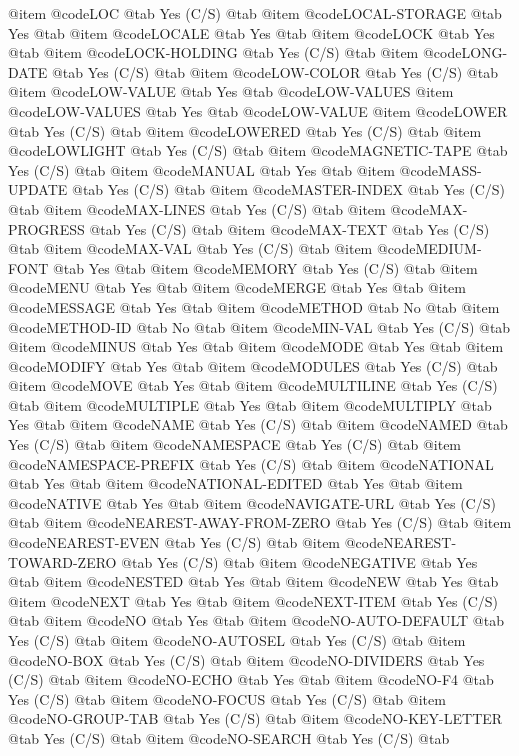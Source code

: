 @item @code{LOC} @tab Yes	(C/S) @tab 
@item @code{LOCAL-STORAGE} @tab Yes @tab 
@item @code{LOCALE} @tab Yes @tab 
@item @code{LOCK} @tab Yes @tab 
@item @code{LOCK-HOLDING} @tab Yes	(C/S) @tab 
@item @code{LONG-DATE} @tab Yes	(C/S) @tab 
@item @code{LOW-COLOR} @tab Yes	(C/S) @tab 
@item @code{LOW-VALUE} @tab Yes @tab @code{LOW-VALUES}
@item @code{LOW-VALUES} @tab Yes @tab @code{LOW-VALUE}
@item @code{LOWER} @tab Yes	(C/S) @tab 
@item @code{LOWERED} @tab Yes	(C/S) @tab 
@item @code{LOWLIGHT} @tab Yes	(C/S) @tab 
@item @code{MAGNETIC-TAPE} @tab Yes	(C/S) @tab 
@item @code{MANUAL} @tab Yes @tab 
@item @code{MASS-UPDATE} @tab Yes	(C/S) @tab 
@item @code{MASTER-INDEX} @tab Yes	(C/S) @tab 
@item @code{MAX-LINES} @tab Yes	(C/S) @tab 
@item @code{MAX-PROGRESS} @tab Yes	(C/S) @tab 
@item @code{MAX-TEXT} @tab Yes	(C/S) @tab 
@item @code{MAX-VAL} @tab Yes	(C/S) @tab 
@item @code{MEDIUM-FONT} @tab Yes @tab 
@item @code{MEMORY} @tab Yes	(C/S) @tab 
@item @code{MENU} @tab Yes @tab 
@item @code{MERGE} @tab Yes @tab 
@item @code{MESSAGE} @tab Yes @tab 
@item @code{METHOD} @tab No @tab 
@item @code{METHOD-ID} @tab No @tab 
@item @code{MIN-VAL} @tab Yes	(C/S) @tab 
@item @code{MINUS} @tab Yes @tab 
@item @code{MODE} @tab Yes @tab 
@item @code{MODIFY} @tab Yes @tab 
@item @code{MODULES} @tab Yes	(C/S) @tab 
@item @code{MOVE} @tab Yes @tab 
@item @code{MULTILINE} @tab Yes	(C/S) @tab 
@item @code{MULTIPLE} @tab Yes @tab 
@item @code{MULTIPLY} @tab Yes @tab 
@item @code{NAME} @tab Yes	(C/S) @tab 
@item @code{NAMED} @tab Yes	(C/S) @tab 
@item @code{NAMESPACE} @tab Yes	(C/S) @tab 
@item @code{NAMESPACE-PREFIX} @tab Yes	(C/S) @tab 
@item @code{NATIONAL} @tab Yes @tab 
@item @code{NATIONAL-EDITED} @tab Yes @tab 
@item @code{NATIVE} @tab Yes @tab 
@item @code{NAVIGATE-URL} @tab Yes	(C/S) @tab 
@item @code{NEAREST-AWAY-FROM-ZERO} @tab Yes	(C/S) @tab 
@item @code{NEAREST-EVEN} @tab Yes	(C/S) @tab 
@item @code{NEAREST-TOWARD-ZERO} @tab Yes	(C/S) @tab 
@item @code{NEGATIVE} @tab Yes @tab 
@item @code{NESTED} @tab Yes @tab 
@item @code{NEW} @tab Yes @tab 
@item @code{NEXT} @tab Yes @tab 
@item @code{NEXT-ITEM} @tab Yes	(C/S) @tab 
@item @code{NO} @tab Yes @tab 
@item @code{NO-AUTO-DEFAULT} @tab Yes	(C/S) @tab 
@item @code{NO-AUTOSEL} @tab Yes	(C/S) @tab 
@item @code{NO-BOX} @tab Yes	(C/S) @tab 
@item @code{NO-DIVIDERS} @tab Yes	(C/S) @tab 
@item @code{NO-ECHO} @tab Yes @tab 
@item @code{NO-F4} @tab Yes	(C/S) @tab 
@item @code{NO-FOCUS} @tab Yes	(C/S) @tab 
@item @code{NO-GROUP-TAB} @tab Yes	(C/S) @tab 
@item @code{NO-KEY-LETTER} @tab Yes	(C/S) @tab 
@item @code{NO-SEARCH} @tab Yes	(C/S) @tab 

